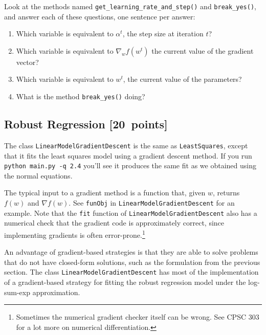 \documentclass{article}
\newcommand{\blu}[1]{{\textcolor{blu}{#1}}}
\let\ask\blu
\newcommand\pts[1]{\textcolor{pointscolour}{[#1~points]}}
\begin{document}
Look at the methods named \texttt{get\_learning\_rate\_and\_step()} and \texttt{break\_yes()}, and \ask{answer each of these questions, one sentence per answer:}
\begin{enumerate}
	\item Which variable is equivalent to $\alpha^t$, the step size at iteration $t$?
	\item Which variable is equivalent to $\nabla_w f(w^t)$ the current value of the gradient vector?
	\item Which variable is equivalent to $w^t$, the current value of the parameters?
	\item What is the method \texttt{break\_yes()} doing?
\end{enumerate}


\subsection{Robust Regression \pts{20}}

The class \texttt{LinearModelGradientDescent} is the same as \texttt{LeastSquares}, except that it fits the least squares model using a gradient descent method. If you run \verb|python main.py -q 2.4| you'll see it produces the same fit as we obtained using the normal equations.


The typical input to a gradient method is a function that, given $w$, returns $f(w)$ and $\nabla f(w)$. See \texttt{funObj} in \texttt{LinearModelGradientDescent} for an example. Note that the \texttt{fit} function of \texttt{LinearModelGradientDescent} also has a numerical check that the gradient code is approximately correct, since implementing gradients is often error-prone.\footnote{Sometimes the numerical gradient checker itself can be wrong. See CPSC 303 for a lot more on numerical differentiation.}

An advantage of gradient-based strategies is that they are able to solve
problems that do not have closed-form solutions, such as the formulation from the
previous section. The class \texttt{LinearModelGradientDescent} has most of the implementation
of a gradient-based strategy for fitting the robust regression model under the log-sum-exp approximation.
\end{document}
